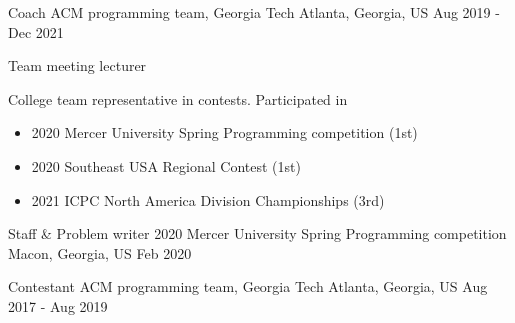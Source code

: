 


\begin{cventries}


\cventry
{Coach} %
{ACM programming team, Georgia Tech} %
{Atlanta, Georgia, US} %
{Aug 2019 - Dec 2021} %
{ %
\begin{cvitems}
\item {Team meeting lecturer}
\item {College team representative in contests. Participated in
	\begin{itemize}
		\item 2020 Mercer University Spring Programming competition (1st)
		\item 2020 Southeast USA Regional Contest (1st)
		\item 2021 ICPC North America Division Championships (3rd)
	\end{itemize}
}
\end{cvitems}
}


\cventry
{Staff \& Problem writer} %
{2020 Mercer University Spring Programming competition} %
{Macon, Georgia, US} %
{Feb 2020} %
{ %
}




\cventry
{Contestant} %
{ACM programming team, Georgia Tech} %
{Atlanta, Georgia, US} %
{Aug 2017 - Aug 2019} %
{ %
}




\end{cventries}